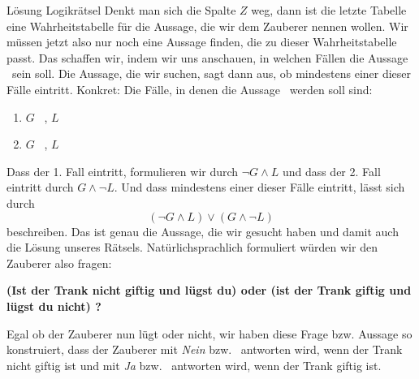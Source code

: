 \documentclass[../../main.tex]{subfiles}
\begin{document}
\begin{example}{Lösung Logikrätsel}
    Denkt man sich die Spalte $Z$ weg, dann ist die letzte Tabelle eine Wahrheitstabelle
    für die Aussage, die wir dem Zauberer nennen wollen. Wir müssen jetzt also nur
    noch eine Aussage finden, die zu dieser Wahrheitstabelle passt.
    Das schaffen wir, indem wir uns anschauen, in welchen Fällen die Aussage \wahr\  sein soll.
    Die Aussage, die wir suchen, sagt dann aus, ob mindestens einer dieser Fälle eintritt.
    Konkret: Die Fälle, in denen die Aussage \wahr\  werden soll sind:
    \begin{enumerate}
        \item $G$ \falsch\ , $L$ \wahr\
        \item $G$ \wahr\ , $L$ \falsch
    \end{enumerate}
    Dass der 1. Fall eintritt, formulieren wir durch
    $\lnot G \land L$ und dass der 2. Fall eintritt durch $G \land \lnot L$. 
    Und dass mindestens einer dieser Fälle eintritt, lässt sich durch
    \[ (\lnot G \land L) \lor (G \land \lnot L)\]
    beschreiben.
    Das ist genau die Aussage, die wir gesucht haben und damit auch die Lösung unseres
    Rätsels. Natürlichsprachlich formuliert würden wir den Zauberer also fragen:

    \textbf{(Ist der Trank nicht giftig und lügst du) oder (ist der Trank giftig und lügst du nicht) ?}
    
    Egal ob der Zauberer nun lügt oder nicht, wir haben diese Frage bzw. Aussage so konstruiert,
    dass der Zauberer mit \textit{Nein} bzw. \falsch\ antworten wird, wenn 
    der Trank nicht giftig ist
    und mit \textit{Ja} bzw. \wahr\ antworten wird, wenn der Trank
    giftig ist.

\end{example}
\end{document}

